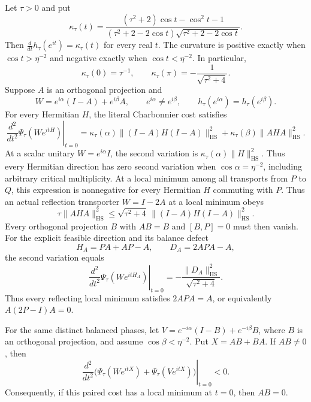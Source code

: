 \begin{proposition}
\label{prop:smoothed-two-phase-hessian}
Let $\tau>0$ and put
\[
 \kappa_\tau(t)=
 \frac{(\tau^2+2)\cos t-\cos^2t-1}
 {(\tau^2+2-2\cos t)\sqrt{\tau^2+2-2\cos t}}.
\]
Then $\frac{d}{dt}h_\tau(e^{it})=\kappa_\tau(t)$ for every real $t$.
The curvature is positive exactly when $\cos t>\eta^{-2}$ and negative
exactly when $\cos t<\eta^{-2}$. In particular,
\[
 \kappa_\tau(0)=\tau^{-1},\qquad
 \kappa_\tau(\pi)=-\frac1{\sqrt{\tau^2+4}}.
\]
Suppose $A$ is an orthogonal projection and
\[
 W=e^{i\alpha}(I-A)+e^{i\beta}A,\qquad
 e^{i\alpha}\ne e^{i\beta},\qquad
 h_\tau(e^{i\alpha})=h_\tau(e^{i\beta}).
\]
For every Hermitian $H$, the literal Charbonnier cost satisfies
\[
 \left.\frac{d^2}{dt^2}\Psi_\tau(We^{itH})\right|_{t=0}
 =\kappa_\tau(\alpha)\|(I-A)H(I-A)\|_{\mathrm{HS}}^2
  +\kappa_\tau(\beta)\|AHA\|_{\mathrm{HS}}^2.
\]
At a scalar unitary $W=e^{i\alpha}I$, the second variation is
$\kappa_\tau(\alpha)\|H\|_{\mathrm{HS}}^2$.
Thus every Hermitian direction has zero second variation when
$\cos\alpha=\eta^{-2}$, including arbitrary critical multiplicity.
At a local minimum among all transports from $P$ to $Q$, this expression
is nonnegative for every Hermitian $H$ commuting with $P$.
Thus an actual reflection transporter $W=I-2A$ at a local minimum obeys
\[
 \tau\|AHA\|_{\mathrm{HS}}^2\leq
 \sqrt{\tau^2+4}\,\|(I-A)H(I-A)\|_{\mathrm{HS}}^2.
\]
Every orthogonal projection $B$ with $AB=B$ and $[B,P]=0$ must then vanish.
For the explicit feasible direction and its balance defect
\[
 H_A=PA+AP-A,\qquad D_A=2APA-A,
\]
the second variation equals
\[
 \left.\frac{d^2}{dt^2}\Psi_\tau(We^{itH_A})\right|_{t=0}
       =-\frac{\|D_A\|_{\mathrm{HS}}^2}{\sqrt{\tau^2+4}}.
\]
Thus every reflecting local minimum satisfies $2APA=A$, or equivalently
$A(2P-I)A=0$.

For the same distinct balanced phases, let
$V=e^{-i\alpha}(I-B)+e^{-i\beta}B$, where $B$ is an orthogonal projection,
and assume $\cos\beta<\eta^{-2}$. Put $X=AB+BA$.
If $AB\ne0$, then
\[
 \left.\frac{d^2}{dt^2}
   \bigl(\Psi_\tau(We^{itX})+\Psi_\tau(Ve^{itX})\bigr)\right|_{t=0}<0.
\]
Consequently, if this paired cost has a local minimum at $t=0$, then $AB=0$.
\end{proposition}

